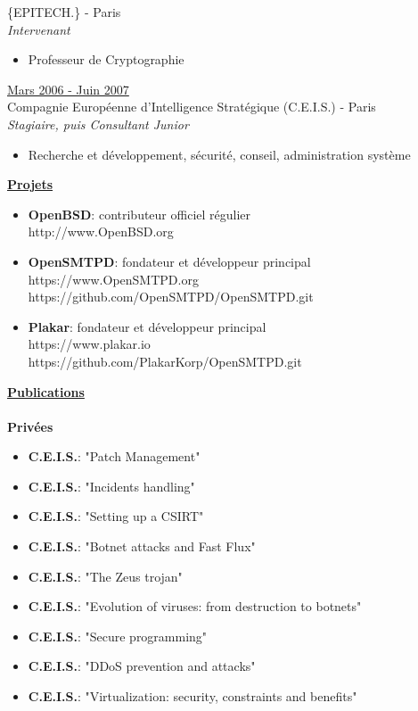 \documentclass[a4paper,10pt]{letter}
\begin{document}
\begin{description}
  \{EPITECH.\} - Paris\\
  \textit{Intervenant}
  \begin{itemize}
  \item Professeur de Cryptographie\\
  \end{itemize}

\item{\underline{Mars 2006 - Juin 2007}} \\
  Compagnie Europ\'eenne d'Intelligence Strat\'egique (C.E.I.S.) - Paris\\
  \textit{Stagiaire, puis Consultant Junior}
  \begin{itemize}
  \item Recherche et d\'eveloppement, s\'ecurit\'e, conseil, administration syst\`eme\\
  \end{itemize}
\end{description}

\pagebreak

\underline{\textbf{Projets}}\\
\begin{itemize}
\item	\textbf{OpenBSD}: contributeur officiel r\'egulier\\
  http://www.OpenBSD.org\\
\item	\textbf{OpenSMTPD}: fondateur et d\'eveloppeur principal\\
  https://www.OpenSMTPD.org\\
  https://github.com/OpenSMTPD/OpenSMTPD.git\\
\item	\textbf{Plakar}: fondateur et d\'eveloppeur principal\\
  https://www.plakar.io\\
  https://github.com/PlakarKorp/OpenSMTPD.git\\
\end{itemize}

\underline{\textbf{Publications}}\\
\\
\textbf{Priv\'ees}
\begin{itemize}
\item	\textbf{C.E.I.S.}: "Patch Management"
\item	\textbf{C.E.I.S.}: "Incidents handling"
\item	\textbf{C.E.I.S.}: "Setting up a CSIRT"
\item	\textbf{C.E.I.S.}: "Botnet attacks and Fast Flux"
\item	\textbf{C.E.I.S.}: "The Zeus trojan"
\item	\textbf{C.E.I.S.}: "Evolution of viruses: from destruction to botnets"
\item	\textbf{C.E.I.S.}: "Secure programming"
\item	\textbf{C.E.I.S.}: "DDoS prevention and attacks"
\item	\textbf{C.E.I.S.}: "Virtualization: security, constraints and benefits"\\
\end{itemize}
\end{document}
